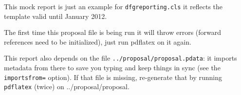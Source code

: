 \documentclass[gitinfo]{dfgreporting}
\begin{document}
\begin{center}\color{red}\huge
  This mock report is just an example for \texttt{dfgreporting.cls} it reflects the
  template valid until January 2012.
\end{center}

\begin{Large}\color{red}
  The first time this proposal file is being run it will throw errors (forward references
  need to be initialized), just run pdflatex on it again.

  This report also depends on the file \texttt{../proposal/proposal.pdata}: it imports
  metadata from there to save you typing and keep things in sync (see the
  \texttt{importsfrom=} option). If that file is missing, re-generate that by running
  \texttt{pdflatex} (twice) on ../proposal/proposal.
\end{Large}

\begin{report}[
  importfrom=../proposal/proposal,
  key = KO 2428 99-9,
  key = GS 4711 99-9,
  thema=Intelligentes Schreiben von Antr\"agen, 
  reportperiod=1. Feb. 2010 - 31. Jan. 2012,
  instrument=Final Project Report, 
  applareas={Knowledge Management, Document Management, Workflow Systems},
  acronym={ABC},
  discipline={Elektrotechnik},
  areas={Ingenieurwissenschaften},
  projpapers={Kohlhase:pdpl10,providemore}]


\end{report}
\end{document}
